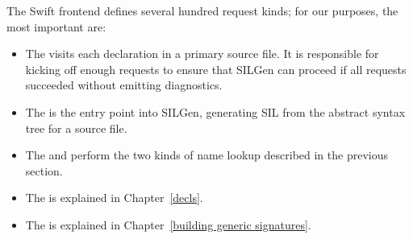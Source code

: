 \documentclass[../generics]{subfiles}
\begin{document}
The Swift frontend defines several hundred request kinds; for our purposes, the most important are:
\begin{itemize}
\item The  visits each declaration in a primary source file. It is responsible for kicking off enough requests to ensure that SILGen can proceed if all requests succeeded without emitting diagnostics.
\item The  is the entry point into SILGen, generating SIL from the abstract syntax tree for a source file.
\item The  and  perform the two kinds of name lookup described in the previous section.
\item The  is explained in Chapter~\ref{decls}.
\item The  is explained in Chapter~\ref{building generic signatures}.
\end{itemize}
\end{document}
